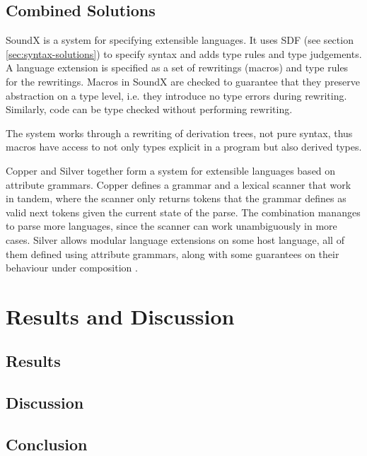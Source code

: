 \documentclass{kththesis}
\begin{document}
\section{Combined Solutions} \label{sec:full-solutions}

SoundX \cite{Lorenzen2016} is a system for specifying extensible languages. It uses SDF (see section \ref{sec:syntax-solutions}) to specify syntax and adds type rules and type judgements. A language extension is specified as a set of rewritings (macros) and type rules for the rewritings. Macros in SoundX are checked to guarantee that they preserve abstraction on a type level, i.e. they introduce no type errors during rewriting. Similarly, code can be type checked without performing rewriting.

The system works through a rewriting of derivation trees, not pure syntax, thus macros have access to not only types explicit in a program but also derived types.

Copper \cite{VanWyk2007} and Silver \cite{Van-Wyk2010Silver:-An-exte} together form a system for extensible languages based on attribute grammars. Copper defines a grammar and a lexical scanner that work in tandem, where the scanner only returns tokens that the grammar defines as valid next tokens given the current state of the parse. The combination mananges to parse more languages, since the scanner can work unambiguously in more cases. Silver allows modular language extensions on some host language, all of them defined using attribute grammars, along with some guarantees on their behaviour under composition \cite{Kaminski2017Reliably-compos}.

\chapter{Results and Discussion}

\section{Results}

\section{Discussion}

\section{Conclusion}

\printbibliography[heading=bibintoc]


\end{document}
